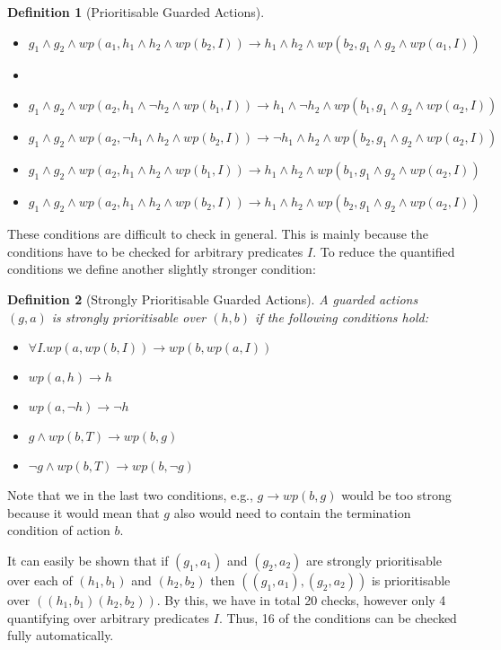 \documentclass[11pt]{article}
\newtheorem{definition}{Definition}
\begin{document}
\begin{definition}[Prioritisable Guarded Actions]
\begin{itemize}
  \item $g_1 \land g_2 \land wp(a_1, h_1 \land h_2 \land wp(b_2,I)) \longrightarrow h_1 \land h_2 \land wp(b_2,g_1 \land g_2 \land wp(a_1,I))$
  \item[]
  \item $g_1 \land g_2 \land wp(a_2,h_1 \land \lnot h_2 \land wp(b_1,I)) \longrightarrow h_1 \land \lnot h_2 \land wp(b_1,g_1 \land g_2 \land wp(a_2,I))$ 
  \item $g_1 \land g_2 \land wp(a_2,\lnot h_1 \land h_2 \land wp(b_2,I)) \longrightarrow \lnot h_1 \land h_2 \land wp(b_2,g_1 \land g_2 \land wp(a_2,I))$
  \item $g_1 \land g_2 \land wp(a_2, h_1 \land h_2 \land wp(b_1,I)) \longrightarrow h_1 \land h_2 \land wp(b_1,g_1 \land g_2 \land wp(a_2,I))$
  \item $g_1 \land g_2 \land wp(a_2, h_1 \land h_2 \land wp(b_2,I)) \longrightarrow h_1 \land h_2 \land wp(b_2,g_1 \land g_2 \land wp(a_2,I))$
\end{itemize}
\end{definition}

These conditions are difficult to check in general. This is mainly because the conditions have to be checked for arbitrary predicates $I$. To reduce the quantified conditions we define another slightly stronger condition:

\begin{definition}[Strongly Prioritisable Guarded Actions]
A guarded actions $(g,a)$ is strongly prioritisable over $(h,b)$ if the following conditions hold:
\begin{itemize}
  \item $\forall I. wp(a,wp(b,I)) \longrightarrow  wp(b,wp(a,I))$
  \item $wp(a, h) \longrightarrow h$
  \item $wp(a, \lnot h) \longrightarrow \lnot h$
  \item $g \land wp(b,T) \longrightarrow wp(b, g)$
  \item $\lnot g \land wp(b,T) \longrightarrow wp(b, \lnot g)$
\end{itemize}
\end{definition}

Note that we in the last two conditions, e.g., $g \longrightarrow wp(b,g)$ would be too strong because it would mean that $g$ also would need to contain the termination condition of action $b$. 

It can easily be shown that if $(g_1,a_1)$ and $(g_2,a_2)$ are strongly prioritisable over each of $(h_1,b_1)$ and $(h_2,b_2)$ then $((g_1,a_1),(g_2,a_2))$ is prioritisable over $((h_1,b_1)(h_2,b_2))$. By this, we have in total 20 checks, however only 4 quantifying over arbitrary predicates $I$. Thus, 16 of the conditions can be checked fully automatically.
\end{document}
